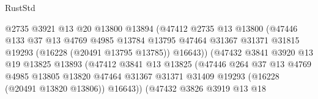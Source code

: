 \begin{lexlean}{RustStd}
\begin{coremodule}
                                    @2735
                                    @3921
                                    @13
                                    @20
                                    @13800
                                    @13894
                                    (@47412
                                      @2735
                                      @13
                                      @13800
                                      (@47446
                                        @133
                                        @37
                                        @13
                                        @4769
                                        @4985
                                        @13784
                                        @13795
                                        @47464
                                        @31367
                                        @31371
                                        @31815
                                        @19293
                                        (@16228 (@20491 @13795 @13785))
                                        @16643))
                                    (@47432
                                      @3841
                                      @3920
                                      @13
                                      @19
                                      @13825
                                      @13893
                                      (@47412
                                        @3841
                                        @13
                                        @13825
                                        (@47446
                                          @264
                                          @37
                                          @13
                                          @4769
                                          @4985
                                          @13805
                                          @13820
                                          @47464
                                          @31367
                                          @31371
                                          @31409
                                          @19293
                                          (@16228 (@20491 @13820 @13806))
                                          @16643))
                                      (@47432
                                        @3826
                                        @3919
                                        @13
                                        @18

\end{coremodule}
\end{lexlean}
